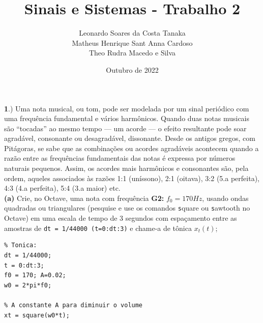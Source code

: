 \documentclass[10pt, a4paper]{article}
\title{Sinais e Sistemas - Trabalho 2}
\author{
    Leonardo Soares da Costa Tanaka\\
    Matheus Henrique Sant Anna Cardoso \\
    Theo Rudra Macedo e Silva
}
\date{Outubro de 2022}
\begin{document}
\maketitle

{\textbf 1.)} Uma nota musical, ou tom, pode ser modelada por um sinal periódico com uma frequência fundamental e vários harmônicos. Quando duas notas musicais são “tocadas” ao mesmo tempo — um acorde — o efeito resultante pode soar agradável, consonante ou desagradável, dissonante. Desde os antigos gregos, com Pitágoras, se sabe que as combinações ou acordes agradáveis acontecem quando a razão entre as frequências fundamentais das notas é expressa por números naturais pequenos. Assim, os acordes mais harmônicos e consonantes são, pela ordem, aqueles associados às razões 1:1 (uníssono), 2:1 (oitava), 3:2 (5.a perfeita), 4:3 (4.a perfeita), 5:4 (3.a maior) etc.\\
{\textbf{(a)}} Crie, no Octave, uma nota com frequência \textbf{G2:} $f_{0} = 170Hz$, usando ondas quadradas ou triangulares (pesquise e use os comandos {\texttt square} ou {\texttt sawtooth} no Octave) em uma escala de tempo de 3 segundos com espaçamento entre as amostras de {\texttt{dt = 1/44000 (t=0:dt:3)}} e chame-a de tônica $x_{t}(t)$;
\begin{verbatim}
% Tonica:
dt = 1/44000;
t = 0:dt:3;
f0 = 170; A=0.02;
w0 = 2*pi*f0;

% A constante A para diminuir o volume
xt = square(w0*t);
\end{verbatim}
\end{document}
